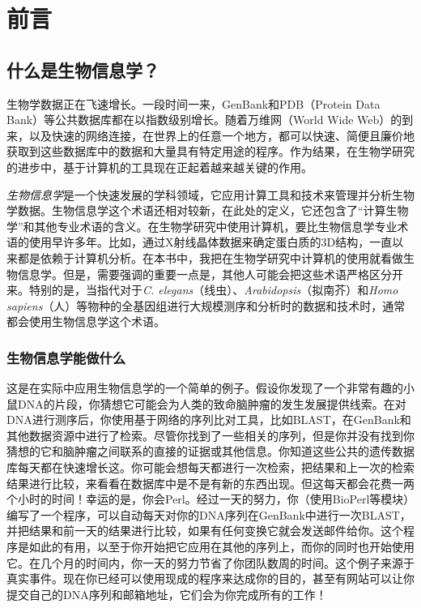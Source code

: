 \setcounter{page}{1}
\chapter*{前\quad 言}

\section*{什么是生物信息学？}
生物学数据正在飞速增长。一段时间一来，GenBank和PDB（Protein Data
Bank）等公共数据库都在以指数级别增长。随着万维网（World Wide
Web）的到来，以及快速的网络连接，在世界上的任意一个地方，都可以快速、简便且廉价地获取到这些数据库中的数据和大量具有特定用途的程序。作为结果，在生物学研究的进步中，基于计算机的工具现在正起着越来越关键的作用。

\textit{生物信息学}是一个快速发展的学科领域，它应用计算工具和技术来管理并分析生物学数据。生物信息学这个术语还相对较新，在此处的定义，它还包含了“计算生物学”和其他专业术语的含义。在生物学研究中使用计算机，要比生物信息学专业术语的使用早许多年。比如，通过X射线晶体数据来确定蛋白质的3D结构，一直以来都是依赖于计算机分析。在本书中，我把在生物学研究中计算机的使用就看做生物信息学。但是，需要强调的重要一点是，其他人可能会把这些术语严格区分开来。特别的是，当指代对于\textit{C.  elegans}（线虫）、\textit{Arabidopsis}（拟南芥）和\textit{Homo sapiens}（人）等物种的全基因组进行大规模测序和分析时的数据和技术时，通常都会使用生物信息学这个术语。

\subsection*{生物信息学能做什么}
这是在实际中应用生物信息学的一个简单的例子。假设你发现了一个非常有趣的小鼠DNA的片段，你猜想它可能会为人类的致命脑肿瘤的发生发展提供线索。在对DNA进行测序后，你使用基于网络的序列比对工具，比如BLAST，在GenBank和其他数据资源中进行了检索。尽管你找到了一些相关的序列，但是你并没有找到你猜想的它和脑肿瘤之间联系的直接的证据或其他信息。你知道这些公共的遗传数据库每天都在快速增长这。你可能会想每天都进行一次检索，把结果和上一次的检索结果进行比较，来看看在数据库中是不是有新的东西出现。但这每天都会花费一两个小时的时间！幸运的是，你会Perl。经过一天的努力，你（使用BioPerl等模块）编写了一个程序，可以自动每天对你的DNA序列在GenBank中进行一次BLAST，并把结果和前一天的结果进行比较，如果有任何变换它就会发送邮件给你。这个程序是如此的有用，以至于你开始把它应用在其他的序列上，而你的同时也开始使用它。在几个月的时间内，你一天的努力节省了你团队数周的时间。这个例子来源于真实事件。现在你已经可以使用现成的程序来达成你的目的，甚至有网站可以让你提交自己的DNA序列和邮箱地址，它们会为你完成所有的工作！

